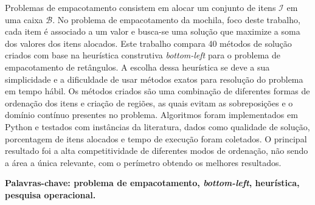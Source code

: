 
\begin{resumo}
    Problemas de empacotamento consistem em alocar um conjunto de itens $\mathcal{I}$ em uma
    caixa $\mathcal{B}$.
    No problema de empacotamento da mochila, foco deste trabalho, cada item é associado a um valor
    e busca-se uma solução que maximize a soma dos valores dos itens alocados.
    Este trabalho compara 40 métodos de solução criados com base na heurística construtiva
    \textit{bottom-left} para o problema de empacotamento de retângulos.
    A escolha dessa heurística se deve a sua simplicidade e a dificuldade de usar métodos exatos
    para resolução do problema em tempo hábil.
    Os métodos criados são uma combinação de diferentes formas de ordenação dos itens e criação
    de regiões, as quais evitam as sobreposições e o domínio contínuo presentes no problema.
    Algoritmos foram implementados em Python e testados com instâncias da literatura, dados como
    qualidade de solução, porcentagem de itens alocados e tempo de execução foram coletados.
    O principal resultado foi a alta competitividade de diferentes modos de ordenação,
    não sendo a área a única relevante, com o perímetro obtendo os melhores resultados.

    \textbf{Palavras-chave: problema de empacotamento, \textit{bottom-left}, heurística,
        pesquisa operacional.}
\end{resumo}
\newpage

